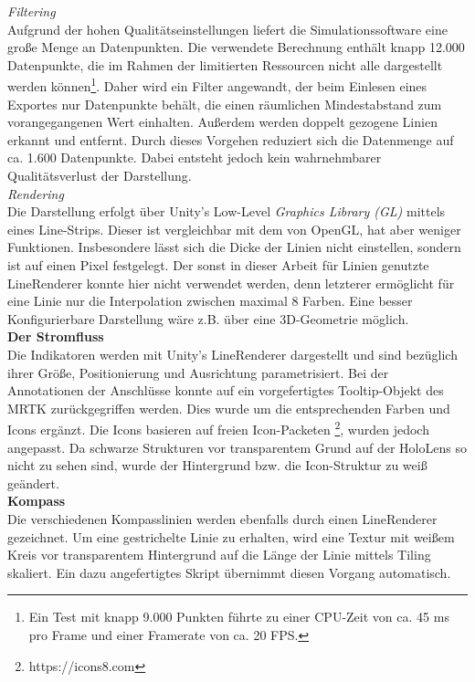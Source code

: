 \textit{Filtering}\\
Aufgrund der hohen Qualitätseinstellungen liefert die Simulationssoftware eine große Menge an Datenpunkten. Die verwendete Berechnung enthält knapp 12.000 Datenpunkte, die im Rahmen der limitierten Ressourcen nicht alle dargestellt werden können\footnote{Ein Test mit knapp 9.000 Punkten führte zu einer CPU-Zeit von ca. 45 ms pro Frame und einer Framerate von ca. 20 FPS.}. Daher wird ein Filter angewandt, der beim Einlesen eines Exportes nur Datenpunkte behält, die einen räumlichen Mindestabstand zum vorangegangenen Wert einhalten. Außerdem werden doppelt gezogene Linien erkannt und entfernt. Durch dieses Vorgehen reduziert sich die Datenmenge auf ca. 1.600 Datenpunkte. Dabei entsteht jedoch kein wahrnehmbarer Qualitätsverlust der Darstellung.\\

\textit{Rendering}\\
Die Darstellung erfolgt über Unity's Low-Level \textit{Graphics Library (GL)} mittels eines Line-Strips. Dieser ist vergleichbar mit dem von OpenGL, hat aber weniger Funktionen. Insbesondere lässt sich die Dicke der Linien nicht einstellen, sondern ist auf einen Pixel festgelegt. Der sonst in dieser Arbeit für Linien genutzte LineRenderer konnte hier nicht verwendet werden, denn letzterer ermöglicht für eine Linie nur die Interpolation zwischen maximal 8 Farben. Eine besser Konfigurierbare Darstellung wäre z.B. über eine 3D-Geometrie möglich.\\

\textbf{Der Stromfluss}\\
Die Indikatoren werden mit Unity's LineRenderer dargestellt und sind bezüglich ihrer Größe, Positionierung und Ausrichtung parametrisiert. Bei der Annotationen der Anschlüsse konnte auf ein vorgefertigtes Tooltip-Objekt des MRTK zurückgegriffen werden. Dies wurde um die entsprechenden Farben und Icons ergänzt. Die Icons basieren auf freien Icon-Packeten \footnote{https://icons8.com}, wurden jedoch angepasst. Da schwarze Strukturen vor transparentem Grund auf der HoloLens so nicht zu sehen sind, wurde der Hintergrund bzw. die Icon-Struktur zu weiß geändert.\\

\textbf{Kompass}\\
Die verschiedenen Kompasslinien werden ebenfalls durch einen LineRenderer gezeichnet. Um eine gestrichelte Linie zu erhalten, wird eine Textur mit weißem Kreis vor transparentem Hintergrund auf die Länge der Linie mittels Tiling skaliert. Ein dazu angefertigtes Skript übernimmt diesen Vorgang automatisch.\\

